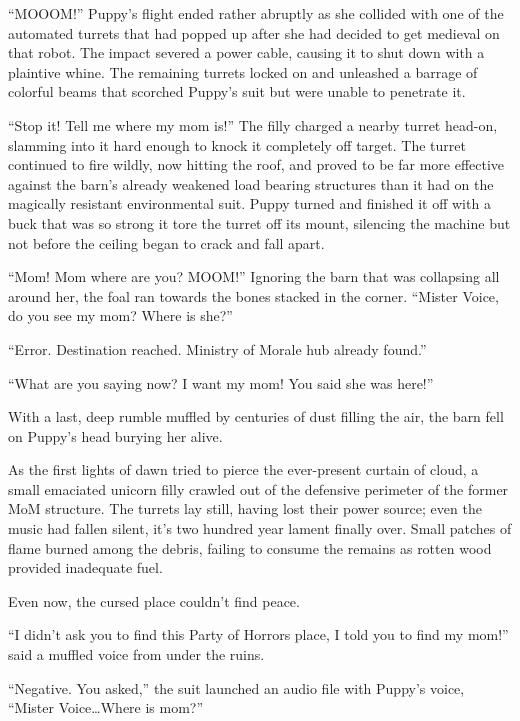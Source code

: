 ``MOOOM!'' Puppy's flight ended rather abruptly as she collided with one of the automated turrets that had popped up after she had decided to get medieval on that robot. The impact severed a power cable, causing it to shut down with a plaintive whine. The remaining turrets locked on and unleashed a barrage of colorful beams that scorched Puppy's suit but were unable to penetrate it.

``Stop it! Tell me where my mom is!'' The filly charged a nearby turret head-on, slamming into it hard enough to knock it completely off target. The turret continued to fire wildly, now hitting the roof, and proved to be far more effective against the barn's already weakened load bearing structures than it had on the magically resistant environmental suit. Puppy turned and finished it off with a buck that was so strong it tore the turret off its mount, silencing the machine but not before the ceiling began to crack and fall apart.

``Mom! Mom where are you? MOOM!'' Ignoring the barn that was collapsing all around her, the foal ran towards the bones stacked in the corner. ``Mister Voice, do you see my mom? Where is she?''

``{\mt Error. Destination reached. Ministry of Morale hub already found.}''

``What are you saying now? I want my mom! You said she was here!''

With a last, deep rumble muffled by centuries of dust filling the air, the barn fell on Puppy's head burying her alive.

As the first lights of dawn tried to pierce the ever-present curtain of cloud, a small emaciated unicorn filly crawled out of the defensive perimeter of the former MoM structure. The turrets lay still, having lost their power source; even the music had fallen silent, it's two hundred year lament finally over. Small patches of flame burned among the debris, failing to consume the remains as rotten wood provided inadequate fuel.

\horizonline


Even now, the cursed place couldn't find peace.

``I didn't ask you to find this Party of Horrors place, I told you to find my mom!'' said a muffled voice from under the ruins.

``{\mt Negative. You asked,'' the suit launched an audio file with Puppy's voice, ``Mister Voice\dots Where is mom?}''

